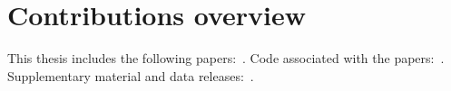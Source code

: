 \documentclass[
12pt, %
english, %
doublespacing, %
headsepline, %
]{MastersDoctoralThesis} %
\begin{document}
\chapter*{Contributions overview}

This thesis includes the following papers:~\cite{Finch:2021iip, Finch:2021qph, Finch:2022ynt}.
Code associated with the papers:~\cite{qnmfits, fdringdown}.
Supplementary material and data releases:~\cite{finch_eliot_2021_4538194, finch_eliot_2021_5569759, finch_eliot_2022_6949492}.


\mainmatter %

\pagestyle{thesis} %



 

 




%
%
%


\singlespacing
\printbibliography

\end{document}
